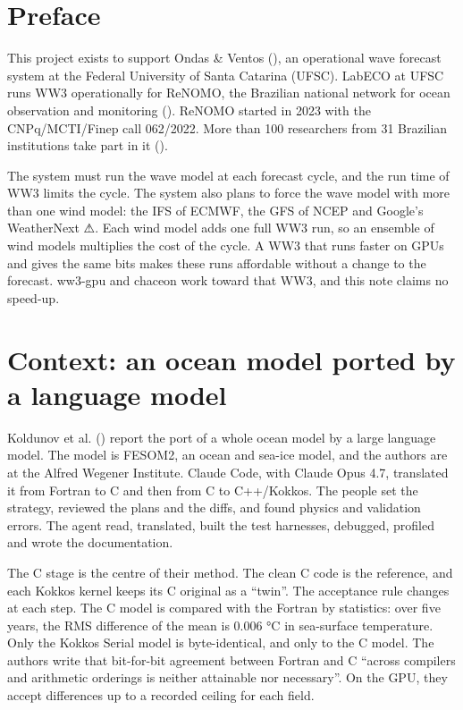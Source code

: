 \documentclass[10pt,a4paper,]{article}
\begin{document}
\section*{Preface}\label{preface}

This project exists to support Ondas \& Ventos
(), an operational wave forecast system at the Federal University of
Santa Catarina (UFSC). LabECO at UFSC runs WW3 operationally for ReNOMO,
the Brazilian national network for ocean observation and monitoring
(). ReNOMO started in 2023 with
the CNPq/MCTI/Finep call 062/2022. More than 100 researchers from 31
Brazilian institutions take part in it
().

The system must run the wave model at each forecast cycle, and the run
time of WW3 limits the cycle. The system also plans to force the wave
model with more than one wind model: the IFS of ECMWF, the GFS of NCEP
and Google's WeatherNext ⚠. Each wind model adds one full WW3 run, so an
ensemble of wind models multiplies the cost of the cycle. A WW3 that
runs faster on GPUs and gives the same bits makes these runs affordable
without a change to the forecast. ww3-gpu and chaceon work toward that
WW3, and this note claims no speed-up.

\setcounter{section}{-1}

\section{Context: an ocean model ported by a language
model}\label{sec:context}

Koldunov et al. ()
report the port of a whole ocean model by a large language model. The
model is FESOM2, an ocean and sea-ice model, and the authors are at the
Alfred Wegener Institute. Claude Code, with Claude Opus 4.7, translated
it from Fortran to C and then from C to C++/Kokkos. The people set the
strategy, reviewed the plans and the diffs, and found physics and
validation errors. The agent read, translated, built the test harnesses,
debugged, profiled and wrote the documentation.

The C stage is the centre of their method. The clean C code is the
reference, and each Kokkos kernel keeps its C original as a ``twin''.
The acceptance rule changes at each step. The C model is compared with
the Fortran by statistics: over five years, the RMS difference of the
mean is 0.006 °C in sea-surface temperature. Only the Kokkos Serial
model is byte-identical, and only to the C model. The authors write that
bit-for-bit agreement between Fortran and C ``across compilers and
arithmetic orderings is neither attainable nor necessary''. On the GPU,
they accept differences up to a recorded ceiling for each field.
\end{document}
